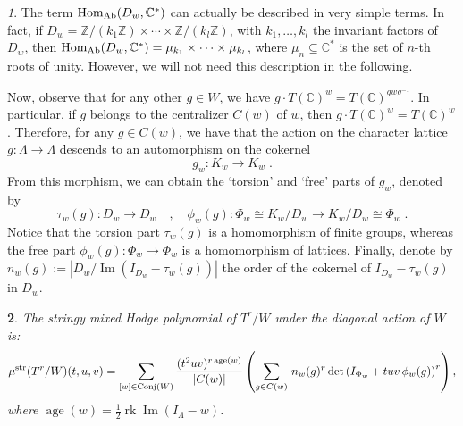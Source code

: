 \documentclass[11pt,english]{amsart}
\numberwithin{equation}{section}
\numberwithin{figure}{section}
\theoremstyle{plain}
\newtheorem{thm}{\protect\theoremname}[section]
\theoremstyle{plain}
\theoremstyle{definition}
\theoremstyle{remark}
\newtheorem{rem}[thm]{\protect\remarkname}
\DeclareMathOperator{\image}{Im}
\newcommand{\ZZ}{\mathbb{Z}}
\newcommand{\CC}{\mathbb{C}}
\newcommand{\Hom}{\operatorname{Hom}}
\newcommand{\rk}{\operatorname{rk}}
\newcommand{\age}{\operatorname{age}}
\newcommand{\str}{\textup{str}}
\newcommand{\Ab}{\textup{Ab}}
\providecommand{\remarkname}{Remark}
\providecommand{\theoremname}{Theorem}
\begin{document}
\begin{rem}
    The term $\Hom_{\Ab}(D_w, \CC^*)$ can actually be described in very simple terms. In fact, if $D_w = \ZZ/(k_1\ZZ) \times \cdots \times \ZZ/(k_l\ZZ)$, with $k_1, \ldots, k_l$ the invariant factors of $D_w$, then $\Hom_{\Ab}(D_w, \CC^*) = \mu_{k_1} \times \cdots \times \mu_{k_l}$, where $\mu_n \subseteq \CC^*$ is the set of $n$-th roots of unity. However, we will not need this description in the following.
\end{rem}

Now, observe that for any other $g \in W$, we have $g \cdot T(\CC)^w = T(\CC)^{gwg^{-1}}$. In particular, if $g$ belongs to the centralizer $C(w)$ of $w$, then $g \cdot T(\CC)^w = T(\CC)^w$. Therefore, for any $g \in C(w)$, we have that the action on the character lattice $g: \Lambda \to \Lambda$ descends to an automorphism on the cokernel
$$
    g_w: K_w \to K_w\; .
$$
From this morphism, we can obtain the `torsion' and `free' parts of $g_w$, denoted by
\begin{equation}\label{g_t-g_f}
    \tau_w(g): D_w \to D_w\quad , \quad \phi_w(g): \Phi_w \cong  K_w/D_w \to K_w/D_w \cong \Phi_w\; .
\end{equation}
Notice that the torsion part $\tau_w(g)$ is a homomorphism of finite groups, whereas the free part \linebreak $\phi_w(g): \Phi_w \to \Phi_w$ is a homomorphism of lattices. Finally, denote by $n_{w}(g) := |D_w/\image(I_{D_w} - \tau_w(g))|$ the order of the cokernel of $I_{D_w} - \tau_w(g)$ in $D_w$.

\begin{thm}\label{thm:algorithm_CV}
    The stringy mixed Hodge polynomial of $T^r/W$ under the diagonal action of $W$ is:
    \[
        \mu^{\str}(T^r/W)(t,u,v)=\sum_{[w] \in \textup{Conj}(W)}
        \frac{(t^{2}uv)^{r\age(w)}}{|C(w)|}\left(\sum_{g \in C(w)} \, n_{w}(g)^r \det\left(I_{\Phi_w} + tuv\,\phi_w(g)\right)^r \right)
        ,
    \]
    where $\age(w) = \frac{1}{2}\rk \image(I_\Lambda -w)$.
\end{thm}
\end{document}
